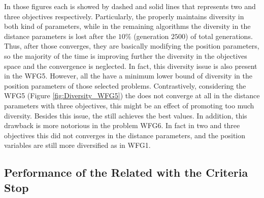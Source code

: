 %
In those figures each \MOEA{} is showed by dashed and solid lines that represents two and three objectives respectively.
%
Particularly, the \VSDMOEA{} properly maintains diversity in both kind of parameters, while in the remaining algorithms the diversity in the distance parameters is lost after the $10\%$ (generation $2500$) of total generations.
%
Thus, after those \MOEAS{} converges, they are basically modifying the position parameters, so the majority of the time is improving further the diversity in the objectives space and the convergence is neglected.
%
In fact, this diversity issue is also present in the WFG5.
%
However, all the \MOEAS{} have a minimum lower bound of diversity in the position parameters of those selected problems.
%
Contrastively, considering the WFG5 (Figure \ref{fig:Diversity_WFG5}) the \VSDMOEA{} does not converge at all in the distance parameters with three objectives, this might be an effect of promoting too much diversity.
%
Besides this issue, the \VSDMOEA{} still achieves the best \HV{} values.
%
In addition, this drawback is more notorious in the problem WFG6.
%
In fact in two and three objectives this \MOEA{} did not converges in the distance parameters, and the position variables are still more diversified as in WFG1.


\begin{figure}[t]
\centering

\label{fig:Diversity_2obj}
\end{figure}


\begin{figure}[t]
\centering

\label{fig:Diversity_3obj}
\end{figure}


%


\subsection{Performance of the \MOEAS{} Related with the Criteria Stop}

